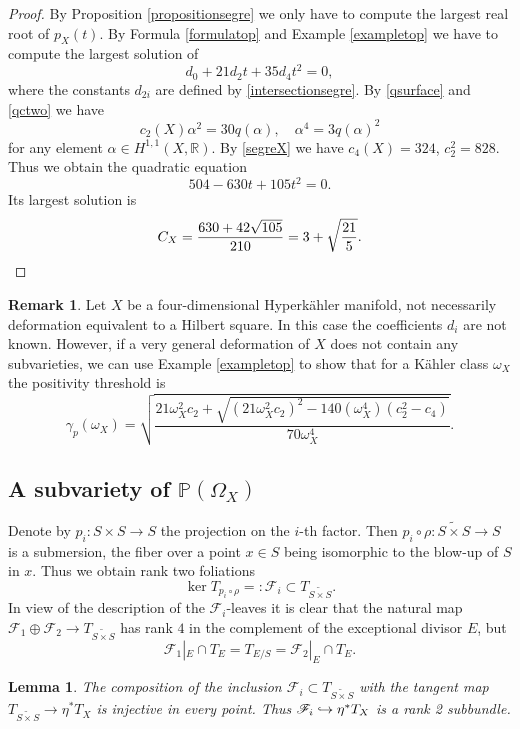 \documentclass[JEP,XML,SOM,Unicode,NoEqCountersInSection,published]{cedram}
\let\mathcal\mathscr
\newcommand\hto{\mathrel{\lhook\joinrel\to}}
\theoremstyle{plain}
\newtheorem{lemma}[theorem]{Lemma}
\theoremstyle{definition}
\newtheorem{remark}[theorem]{Remark}
\newcommand{\R}{\ensuremath{\mathbb{R}}}
\newcommand{\PP}{\ensuremath{\mathbb{P}}}
\newcommand{\holom}[3]{\ensuremath{#1:#2\to #3}}
\newcommand\sF{{\mathcal F}}
\newcommand{\blS}{\ensuremath{\widetilde{S \times S}}}
\begin{document}
\begin{proof}
By Proposition \ref{propositionsegre} we only have to compute the
largest real root of $p_X(t)$.
By Formula \eqref{formulatop} and Example \ref{exampletop}
we have to compute the largest solution of
\[
d_0 + 21 d_2 t + 35 d_4 t^2 = 0,
\]
where the constants $d_{2i}$ are defined by \eqref{intersectionsegre}.
By \eqref{qsurface} and \eqref{qctwo} we have
\[
c_2(X)\alpha^2=30 q(\alpha), \quad \alpha^4=3 q(\alpha)^2
\]
for any element $\alpha\in H^{1,1}(X, \R)$.
By \eqref{segreX} we have $c_4(X)=324$, $c_2^2=828$. Thus we
obtain the quadratic equation
\[
504 - 630 t + 105 t^2 = 0.
\]
Its largest solution is
\[
C_X = \frac{630 + 42 \sqrt{105}}{210} = 3 + \sqrt{\frac{21}{5}}.\qedhere
\]
\end{proof}

\begin{remark}
Let $X$ be a four-dimensional Hyperkähler manifold, not necessarily deformation equivalent to a Hilbert square.
In this case the coefficients $d_i$ are not known. However, if a very general deformation of $X$ does not contain any subvarieties, we can use Example \ref{exampletop} to show that
for a Kähler class $\omega_X$ the
positivity threshold is
\[
\gamma_p(\omega_X)=\sqrt{
\frac{21 \omega_X^2 c_2+\sqrt{(21\omega_X^2c_2)^2- 140(\omega_X^4)(c_2^2-c_4) }}{70\omega_X^4}}.
\]
\end{remark}

\subsection{A subvariety of $\PP(\Omega_X)$} \label{subsectionZ}

Denote by $\holom{p_i}{S \times S}{S}$ the projection on the $i$-th factor.
Then $p_i \circ \rho: \blS \to S$ is a submersion,
the fiber over a point $x \in S$ being isomorphic to the blow-up of $S$ in $x$.
Thus we obtain rank two foliations
\[
\ker T_{p_i \circ \rho} =: \sF_i \subset T_{\blS}.
\]
In view of the description of the $\sF_i$-leaves it is clear that the natural map $\sF_1 \oplus \sF_2 \to T_{\blS}$ has rank $4$ in the complement of the exceptional divisor $E$, but
\[
\sF_1|_E \cap T_E = T_{E/S} = \sF_2|_E \cap T_E.
\]

\begin{lemma} \label{lemmainjection}
The composition of the inclusion $\sF_i \subset T_{\blS}$ with the tangent map $T_{\blS} \to \eta^* T_X$
is injective in every point. Thus $\sF_i \hto \eta^* T_X$ is a rank 2 subbundle.
\end{lemma}
\end{document}
